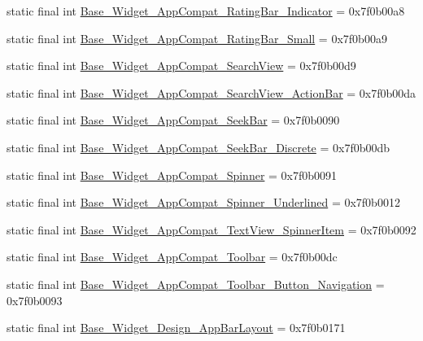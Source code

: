 \begin{CompactItemize}
\item 
static final int \hyperlink{classandroid_1_1support_1_1v7_1_1cardview_1_1_r_1_1style_fda0ddb7526de9be9ad065dd60a04971}{Base\_\-Widget\_\-AppCompat\_\-RatingBar\_\-Indicator} = 0x7f0b00a8
\item 
static final int \hyperlink{classandroid_1_1support_1_1v7_1_1cardview_1_1_r_1_1style_50030cbbc7ef27b099649e63b9a7c4b7}{Base\_\-Widget\_\-AppCompat\_\-RatingBar\_\-Small} = 0x7f0b00a9
\item 
static final int \hyperlink{classandroid_1_1support_1_1v7_1_1cardview_1_1_r_1_1style_88e1f5244090f81e2f6bd5b8450e42ab}{Base\_\-Widget\_\-AppCompat\_\-SearchView} = 0x7f0b00d9
\item 
static final int \hyperlink{classandroid_1_1support_1_1v7_1_1cardview_1_1_r_1_1style_67bd6aec73be9081034c02ca0430c1bb}{Base\_\-Widget\_\-AppCompat\_\-SearchView\_\-ActionBar} = 0x7f0b00da
\item 
static final int \hyperlink{classandroid_1_1support_1_1v7_1_1cardview_1_1_r_1_1style_6f4d33eb42205d01bcb007e5b146d010}{Base\_\-Widget\_\-AppCompat\_\-SeekBar} = 0x7f0b0090
\item 
static final int \hyperlink{classandroid_1_1support_1_1v7_1_1cardview_1_1_r_1_1style_87f0a108d1338d0901a4ce064293794a}{Base\_\-Widget\_\-AppCompat\_\-SeekBar\_\-Discrete} = 0x7f0b00db
\item 
static final int \hyperlink{classandroid_1_1support_1_1v7_1_1cardview_1_1_r_1_1style_d55cd372b043d935f981ed22d5e82dc5}{Base\_\-Widget\_\-AppCompat\_\-Spinner} = 0x7f0b0091
\item 
static final int \hyperlink{classandroid_1_1support_1_1v7_1_1cardview_1_1_r_1_1style_0f607a89216da20cbdff3eba6ef87565}{Base\_\-Widget\_\-AppCompat\_\-Spinner\_\-Underlined} = 0x7f0b0012
\item 
static final int \hyperlink{classandroid_1_1support_1_1v7_1_1cardview_1_1_r_1_1style_4532d12740579f75db9d29bbb680c509}{Base\_\-Widget\_\-AppCompat\_\-TextView\_\-SpinnerItem} = 0x7f0b0092
\item 
static final int \hyperlink{classandroid_1_1support_1_1v7_1_1cardview_1_1_r_1_1style_0ac4bde5ea779d0d2723a44f54d9dcaa}{Base\_\-Widget\_\-AppCompat\_\-Toolbar} = 0x7f0b00dc
\item 
static final int \hyperlink{classandroid_1_1support_1_1v7_1_1cardview_1_1_r_1_1style_a593b5d6ae162ffa1380253fba292f68}{Base\_\-Widget\_\-AppCompat\_\-Toolbar\_\-Button\_\-Navigation} = 0x7f0b0093
\item 
static final int \hyperlink{classandroid_1_1support_1_1v7_1_1cardview_1_1_r_1_1style_35819c30643057ba0da187ae247f9353}{Base\_\-Widget\_\-Design\_\-AppBarLayout} = 0x7f0b0171

\end{CompactItemize}
